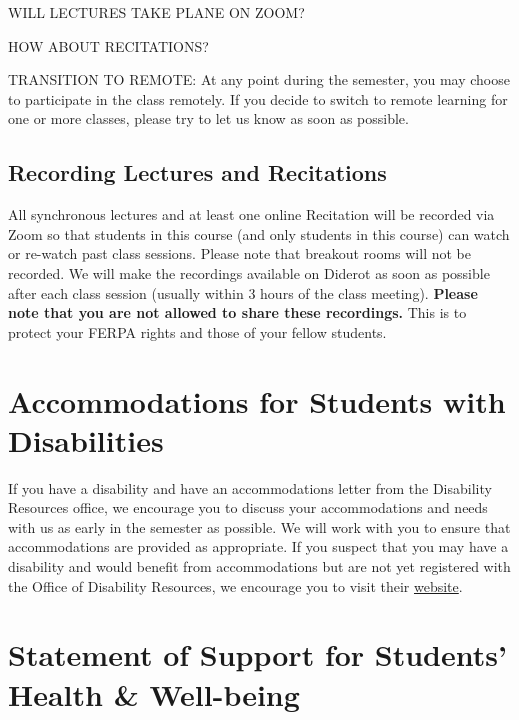 \begin{gram}

WILL LECTURES TAKE PLANE ON ZOOM?

HOW ABOUT RECITATIONS?


TRANSITION TO REMOTE:
At any point during the semester, you may choose to participate in the class remotely. If you decide to switch to remote learning for one or more classes, please try to let us know as soon as possible. 

\end{gram}


\subsection{Recording Lectures and Recitations}
All synchronous lectures and at least one online Recitation will be recorded via Zoom so that students in this course (and only students in this course) can watch or re-watch past class sessions. Please note that breakout rooms will not be recorded. We will make the recordings available on Diderot as soon as possible after each class session (usually within 3 hours of the class meeting). \textbf{Please note that you are not allowed to share these recordings.} This is to protect your FERPA rights and those of your fellow students. 


\section{Accommodations for Students with Disabilities}
If you have a disability and have an accommodations letter from the Disability Resources office, we encourage you to discuss your accommodations and needs with us as early in the semester as possible. We will work with you to ensure that accommodations are provided as appropriate. If you suspect that you may have a disability and would benefit from accommodations but are not yet registered with the Office of Disability Resources, we encourage you to visit their \href{https://www.cmu.edu/disability-resources/}{website}.

\section{Statement of Support for Students’ Health \& Well-being}

